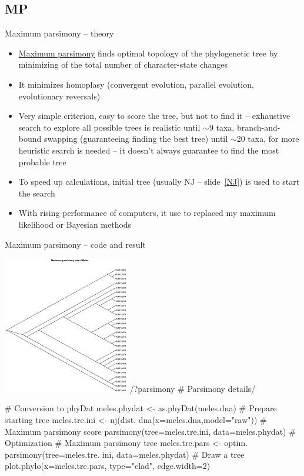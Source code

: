 \documentclass[compress, ucs, xelatex, 11pt, xcolor=svgnames,
  hyperref={
    bookmarks=true,
    unicode=true,
    colorlinks=true,
    pdftitle={Molecular data in R},
    plainpages=false,
    pdfauthor={Vojtech Zeisek},
    pdfsubject={Course about phylogeny and evolution in R},
    pdfcreator={XeLaTeX},
    pdfkeywords={R, evolution, phylogeny, molecular data},
    linkcolor=Tomato,
    anchorcolor=SaddleBrown,
    citecolor=Goldenrod,
    filecolor=DarkMagenta,
    menucolor=Sienna,
    urlcolor=DarkTurquoise,
    pdftex},
  url={hyphens, lowtilde} %
  ]{beamer}
\begin{document}
\subsection{MP}

\begin{frame}{Maximum parsimony -- theory}
  \label{MP}
  \begin{itemize}
    \item \href{https://en.wikipedia.org/wiki/Maximum_parsimony_(phylogenetics)}{Maximum parsimony} finds optimal topology of the phylogenetic tree by minimizing of the total number of character-state changes
    \item It minimizes homoplasy (convergent evolution, parallel evolution, evolutionary reversals)
    \item Very simple criterion, easy to score the tree, but not to find it -- exhaustive search to explore all possible trees is realistic until $\sim$9 taxa, branch-and-bound swapping (guaranteeing finding the best tree) until $\sim$20 taxa, for more heuristic search is needed -- it doesn't always guarantee to find the most probable tree
    \item To speed up calculations, initial tree (usually NJ -- slide~\ref{NJ}) is used to start the search
    \item With rising performance of computers, it use to replaced my maximum likelihood or Bayesian methods
  \end{itemize}
\end{frame}

\begin{frame}[fragile]{Maximum parsimony -- code and result}
\begin{multicols}{2}
  \vfil
  \includegraphics[height=6cm]{parsimony.png}
  \vfil
  \splus/?parsimony # Parsimony details/
  \vfil
  \begin{spluscode}
    # Conversion to phyDat
    meles.phydat <-
      as.phyDat(meles.dna)
    # Prepare starting tree
    meles.tre.ini <- nj(dist.
      dna(x=meles.dna,model="raw"))
    # Maximum parsimony score
    parsimony(tree=meles.tre.ini,
      data=meles.phydat)
    # Optimization
    # Maximum parsimony tree
    meles.tre.pars <- optim.
      parsimony(tree=meles.tre.
      ini, data=meles.phydat)
    # Draw a tree
    plot.phylo(x=meles.tre.pars,
      type="clad", edge.width=2)
  \end{spluscode}
\end{multicols}
\end{frame}
\end{document}
